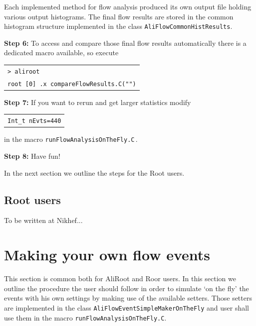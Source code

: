 \documentclass[a4paper]{book}
\numberwithin{equation}{subsection}
\begin{document}
\begin{list}{}{}
\begin{center}
\begin{tabular}[t]{l}
\end{tabular}
\end{center}
%
Each implemented method for flow analysis produced its own output file holding various output histograms. The final flow results are stored in the common histogram structure implemented in the class \texttt{AliFlowCommonHistResults}. 
\item \textbf{Step 6:} To access and compare those final flow results automatically there is a dedicated macro available, so execute  
%
\begin{center}
\begin{tabular}[t]{l}
\texttt{> aliroot} \\
\texttt{root [0] .x compareFlowResults.C("")}
\end{tabular}
\end{center}
%
\item \textbf{Step 7:} If you want to rerun and get larger statistics modify
%
\begin{center}
\begin{tabular}[t]{l}
\texttt{Int\_t nEvts=440} 
\end{tabular}
\end{center}
%
in the macro \texttt{runFlowAnalysisOnTheFly.C}\,.
\item \textbf{Step 8:} Have fun!
\end{list}
In the next section we outline the steps for the Root users.

\subsection{Root users}
To be written at Nikhef...
\section{Making your own flow events}
\label{makingYourOwnFlowEvents}
This section is common both for AliRoot and Roor users. In this section we outline the procedure the user should follow in order to simulate `on the fly' the events with his own settings by making use of the available setters. Those setters are implemented in the class \texttt{AliFlowEventSimpleMakerOnTheFly} and user shall use them in the macro \texttt{runFlowAnalysisOnTheFly.C}.
\end{document}
